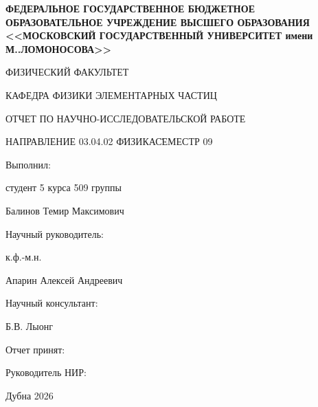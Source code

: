 \documentclass{extarticle}
\begin{document}
    \begin{titlepage}
        \newpage
        \begin{center}
        
            \bfseries ФЕДЕРАЛЬНОЕ ГОСУДАРСТВЕННОЕ БЮДЖЕТНОЕ ОБРАЗОВАТЕЛЬНОЕ УЧРЕЖДЕНИЕ ВЫСШЕГО ОБРАЗОВАНИЯ <<МОСКОВСКИЙ ГОСУДАРСТВЕННЫЙ УНИВЕРСИТЕТ имени М..\@ ЛОМОНОСОВА>>
            
            \vspace{1cm}
            ФИЗИЧЕСКИЙ ФАКУЛЬТЕТ
            \vspace{1cm}
        
            КАФЕДРА ФИЗИКИ ЭЛЕМЕНТАРНЫХ ЧАСТИЦ
        
            \vspace{6cm}
            ОТЧЕТ ПО НАУЧНО-ИССЛЕДОВАТЕЛЬСКОЙ РАБОТЕ 
            
            НАПРАВЛЕНИЕ 03.04.02 \"ФИЗИКА\"
            
            СЕМЕСТР 09
        \end{center}

        \vspace{4cm}

        \begin{flushright}
            Выполнил:
            
            студент 5 курса 509 группы
            
            Балинов Темир Максимович
        \end{flushright}
        
        \vspace{0.5cm}

        \begin{flushright}
            Научный руководитель:
            
            к.ф.-м.н.
            
            Апарин Алексей Андреевич

            Научный консультант:
            
            Б.В. Лыонг
        \end{flushright}

        \vspace{\fill}

        \begin{flushleft}
            Отчет принят: 

            \vspace{0.5cm}

            Руководитель НИР:
        \end{flushleft}
        
        \begin{center}
            Дубна 2026
        \end{center}

    \end{titlepage}
\tableofcontents
\newpage
\linenumbers{}
\end{document}
